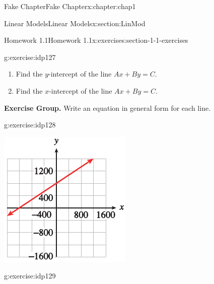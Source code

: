 \documentclass[oneside,10pt,]{book}
\numberwithin{equation}{section}
\begin{document}
\begin{chapterptx}{Fake Chapter}{}{Fake Chapter}{}{}{x:chapter:chap1}
\begin{sectionptx}{Linear Models}{}{Linear Models}{}{}{x:section:LinMod}
\begin{exercises-subsection}{Homework 1.1}{}{Homework 1.1}{}{}{x:exercises:section-1-1-exercises}
\begin{divisionexercise}{32}{}{}{g:exercise:idp127}%
%
\begin{enumerate}[label=\alph*]
\item{}Find the \(y\)-intercept of the line \(Ax + By = C\).%
\item{}Find the \(x\)-intercept of the line \(Ax + By = C\).%
\end{enumerate}
%
\end{divisionexercise}%
\par\medskip\noindent%
\textbf{Exercise Group.}\space\space%
Write an equation in general form for each line.%
\begin{exercisegroupcol}{2}
\begin{divisionexerciseegcol}{33}{}{}{g:exercise:idp128}%
\begin{sidebyside}{1}{0.1}{0.1}{0}%
\begin{sbspanel}{0.8}%
\includegraphics[width=\linewidth]{external/photos/fig-ex-1-1-33.pdf}
\end{sbspanel}%
\end{sidebyside}%
\end{divisionexerciseegcol}%
\begin{divisionexerciseegcol}{34}{}{}{g:exercise:idp129}%
\begin{sidebyside}{1}{0.1}{0.1}{0}%

\end{sidebyside}
\end{divisionexerciseegcol}
\end{exercisegroupcol}
\end{exercises-subsection}
\end{sectionptx}
\end{chapterptx}
\end{document}
